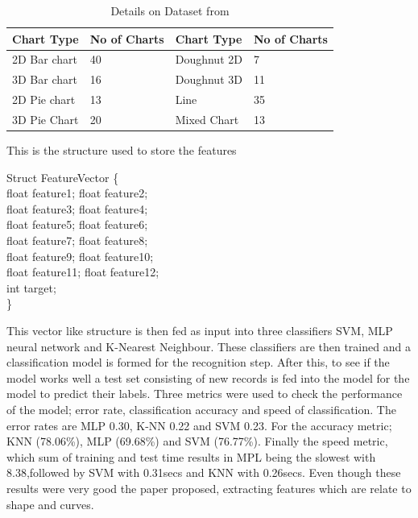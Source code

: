 \documentclass[12pt, a4paper,oneside]{report}
\begin{document}
\begin{table}[h]
	\centering {} \small
	\begin{tabular}{|p{3cm}|p{3cm}|p{3cm}|p{3cm}|}
		\hline
		Chart Type & No of Charts & Chart
		Type & No of Charts  \\ \hline
		2D Bar chart & 40 & Doughnut 2D & 7 \\ \hline
		3D Bar chart & 16 & Doughnut 3D & 11\\ \hline
		2D Pie chart & 13 & Line & 35 \\ \hline
		3D Pie Chart & 20 & Mixed Chart& 13 \\ \hline
	\end{tabular}
	\caption {Details on Dataset from \cite{karthikeyani2012machine} }	
	\label{table:pdf}
\end{table}


\begin{algorithm}
\caption{This is the structure used to store the features}
\label{alg:1}
Struct FeatureVector \{\\
	float feature1; float feature2;\\
	float feature3; float feature4;\\
	float feature5; float feature6;\\
	float feature7; float feature8;\\
	float feature9; float feature10;\\
	float feature11; float feature12;\\
	int target;\\
\}
\end{algorithm}


This vector like structure is then fed as input into three classifiers SVM, MLP neural network and K-Nearest Neighbour. These classifiers are then trained and a classification model is formed for the recognition step. After this, to see if the model works well a test set consisting of new records is fed into the model for the model to predict their labels. Three metrics were used to check the performance of the model; error rate,
classification accuracy and speed of classification. The error rates are MLP 0.30, K-NN 0.22 and SVM 0.23. For the accuracy metric; KNN (78.06\%), MLP (69.68\%) and SVM (76.77\%). Finally the speed metric, which sum of training and test time results in MPL being the slowest with 8.38,followed by SVM with 0.31secs and  KNN with 0.26secs. Even though these results were very good the paper proposed, extracting features which are relate to shape and curves.
\end{document}
